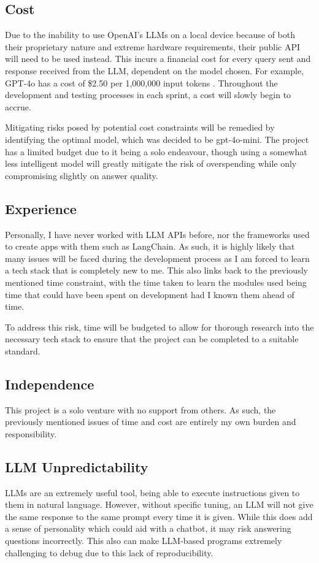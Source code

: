 \subsection{Cost}
Due to the inability to use OpenAI's LLMs on a local device because of both their proprietary nature and extreme hardware requirements,
their public API will need to be used instead. This incurs a financial cost for every query sent and response received from the LLM,
dependent on the model chosen. For example, GPT-4o has a cost of \$2.50 per 1,000,000 input tokens \autocite{openaiPricingOpenAIAPI}.
Throughout the development and testing processes in each sprint, a cost will slowly begin to accrue.

\para Mitigating risks posed by potential cost constraints will be remedied by identifying the optimal model, which was decided to 
be gpt-4o-mini. The project has a limited budget due to it being a solo endeavour, though using a somewhat less intelligent model 
will greatly mitigate the risk of overspending while only compromising slightly on answer quality. 

\subsection{Experience}
Personally, I have never worked with LLM APIs before, nor the frameworks used to create apps with them such as LangChain. As such,
it is highly likely that many issues will be faced during the development process as I am forced to learn a tech stack that is completely 
new to me. This also links back to the previously mentioned time constraint, with the time taken to learn the modules used being time that 
could have been spent on development had I known them ahead of time.

\para To address this risk, time will be budgeted to allow for thorough research into the necessary tech stack to ensure that the project 
can be completed to a suitable standard.

\subsection{Independence}
This project is a solo venture with no support from others. As such, the previously mentioned issues of time and cost are entirely 
my own burden and responsibility. 

\subsection{LLM Unpredictability}
LLMs are an extremely useful tool, being able to execute instructions given to them in natural language. However, without specific tuning, 
an LLM will not give the same response to the same prompt every time it is given. While this does add a sense of personality which could 
aid with a chatbot, it may risk answering questions incorrectly. This also can make LLM-based programs extremely challenging to debug due 
to this lack of reproducibility.

